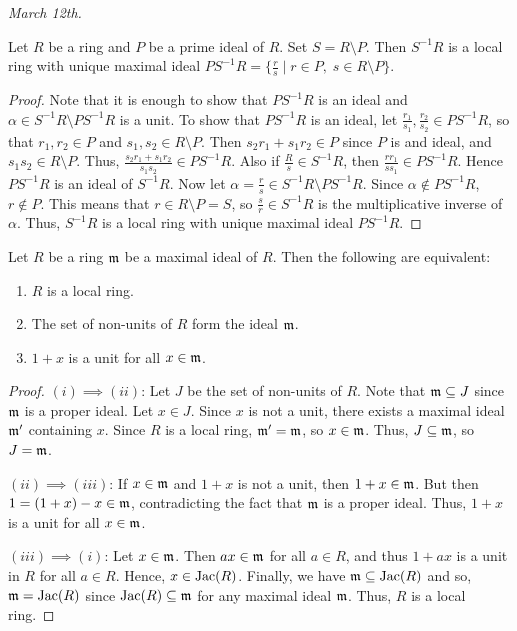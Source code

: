 \textit{March 12th.}

\begin{proposition}
    Let $R$ be a ring and $P$ be a prime ideal of $R$. Set $S = R \setminus P$. Then $S^{-1}R$ is a local ring with unique maximal ideal $PS^{-1}R = \{\frac{r}{s} \mid r \in P,\; s \in R \setminus P\}$.
\end{proposition}
\begin{proof}
    Note that it is enough to show that $PS^{-1}R$ is an ideal and $\alpha \in S^{-1}R \setminus PS^{-1}R$ is a unit. To show that $PS^{-1}R$ is an ideal, let $\frac{r_{1}}{s_{1}},\frac{r_{2}}{s_{2}} \in PS^{-1}R$, so that $r_{1},r_{2} \in P$ and $s_{1},s_{2} \in R \setminus P$. Then $s_{2}r_{1}+s_{1}r_{2} \in P$ since $P$ is and ideal, and $s_{1}s_{2} \in R \setminus P$. Thus, $\frac{s_{2}r_{1}+s_{1}r_{2}}{s_{1}s_{2}} \in PS^{-1}R$. Also if $\frac{R}{s} \in S^{-1}R$, then $\frac{rr_{1}}{ss_{1}} \in PS^{-1}R$. Hence $PS^{-1}R$ is an ideal of $S^{-1}R$. Now let $\alpha = \frac{r}{s} \in S^{-1}R \setminus PS^{-1}R$. Since $\alpha \notin PS^{-1}R$, $r \notin P$. This means that $r \in R \setminus P = S$, so $\frac{s}{r} \in S^{-1}R$ is the multiplicative inverse of $\alpha$. Thus, $S^{-1}R$ is a local ring with unique maximal ideal $PS^{-1}R$.
\end{proof}

\begin{proposition}
    Let $R$ be a ring $\mathfrak{m}$ be a maximal ideal of $R$. Then the following are equivalent:
    \begin{enumerate}[label=(\roman*)]
        \item $R$ is a local ring.
        \item The set of non-units of $R$ form the ideal $\mathfrak{m}$.
        \item $1+x$ is a unit for all $x \in \mathfrak{m}$.
    \end{enumerate}
\end{proposition}

\begin{proof}
    $(i) \implies (ii)$: Let $J$ be the set of non-units of $R$. Note that $\mathfrak{m} \subseteq J$ since $\mathfrak{m}$ is a proper ideal. Let $x \in J$. Since $x$ is not a unit, there exists a maximal ideal $\mathfrak{m}'$ containing $x$. Since $R$ is a local ring, $\mathfrak{m}' = \mathfrak{m}$, so $x \in \mathfrak{m}$. Thus, $J \subseteq \mathfrak{m}$, so $J = \mathfrak{m}$.
    
    $(ii) \implies (iii)$: If $x \in \mathfrak{m}$ and $1+x$ is not a unit, then $1+x \in \mathfrak{m}$. But then $1 = (1+x) - x \in \mathfrak{m}$, contradicting the fact that $\mathfrak{m}$ is a proper ideal. Thus, $1+x$ is a unit for all $x \in \mathfrak{m}$.

    $(iii) \implies (i)$: Let $x \in \mathfrak{m}$. Then $ax \in \mathfrak{m}$ for all $a \in R$, and thus $1 + ax$ is a unit in $R$ for all $a \in R$. Hence, $x \in \operatorname{Jac}(R)$. Finally, we have $\mathfrak{m} \subseteq \operatorname{Jac}(R)$ and so, $\mathfrak{m} = \operatorname{Jac}(R)$ since $\operatorname{Jac}(R) \subseteq \mathfrak{m}$ for any maximal ideal $\mathfrak{m}$. Thus, $R$ is a local ring.
\end{proof}

